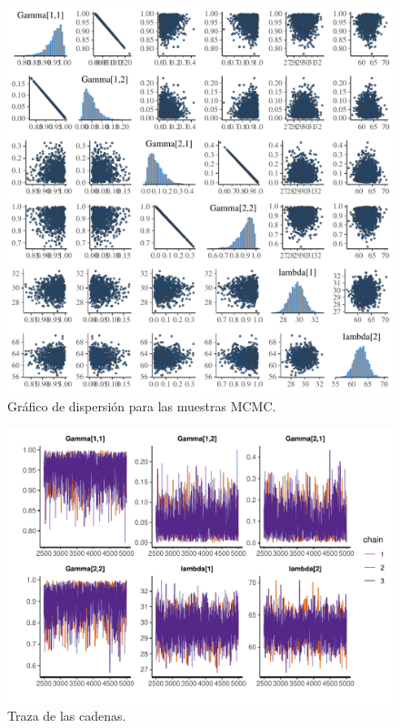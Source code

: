 \documentclass[a4paper]{article}\usepackage[]{graphicx}\usepackage[]{color}
\makeatletter
\def\maxwidth{ %
  \ifdim\Gin@nat@width>\linewidth
    \linewidth
  \else
    \Gin@nat@width
  \fi
}
\newenvironment{knitrout}{}{} %
\makeatother
\begin{document}
\begin{knitrout}
\color{fgcolor}\begin{figure}
\includegraphics[width=\maxwidth]{figure/unnamed-chunk-30-1} \caption[Gráfico de dispersión para las muestras MCMC]{Gráfico de dispersión para las muestras MCMC.}\label{fig:unnamed-chunk-30}
\end{figure}


\end{knitrout}

\begin{knitrout}
\color{fgcolor}\begin{figure}
\includegraphics[width=\maxwidth]{figure/unnamed-chunk-31-1} \caption[Traza de las cadenas]{Traza de las cadenas.}\label{fig:unnamed-chunk-31}
\end{figure}


\end{knitrout}
                              
\end{document}
